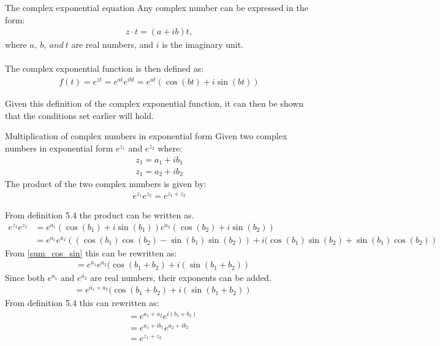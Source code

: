 \begin{definition}{The complex exponential equation}{}
Any complex number can be expressed in the form:
\begin{align*}
	z \cdot t = (a + ib)t,
\end{align*}
where $a,~b,~and~t$ are real numbers, and $i$ is the imaginary unit.
\\
\\
The complex exponential function is then defined as:
\begin{align*}
	f(t)=e^{zt}=e^{at}e^{ibt}=e^{at}\left(\cos(bt)+i\sin(bt)\right)
\end{align*}
\end{definition}
\noindent
Given this definition of the complex exponential function, it can then be shown that the conditions set earlier will hold.
\begin{theorem}{Multiplication of complex numbers in exponential form}{}
Given two complex numbers in exponential form $e^{z_1}$ and $e^{z_2}$ where:
\begin{align*}
z_1=a_1+ib_1
\\
z_1=a_2+ib_2
\end{align*}
The product of the two complex numbers is given by:
\begin{align*}
e^{z_1}e^{z_2}=e^{z_1+z_2}
\end{align*}
\end{theorem}
\begin{prof}{}{}
From definition 5.4 %
the product can be written as.
\begin{align*}
e^{z_1}e^{z_2}&=e^{a_1}(\cos(b_1)+i\sin(b_1))e^{a_2}(\cos(b_2)+i\sin(b_2))
\\
&=e^{a_1}e^{a_2}\left( (\cos(b_1)\cos(b_2)-\sin(b_1) \sin(b_2))+i(\cos(b_1)\sin(b_2)+\sin(b_1)\cos(b_2)\right)
\end{align*}
From \eqref{sum_cos_sin} this can be rewritten as:
\begin{align*}
&=e^{a_1}e^{a_2}(\cos(b_1+b_2)+i(\sin(b_1+b_2))
\end{align*}
Since both $e^{a_1}$ and $e^{a_2}$ are real numbers, their exponents can be added.
\begin{align*}
&=e^{a_1+a_2}(\cos(b_1+b_2)+i(\sin(b_1+b_2))
\end{align*}
From definition 5.4 %
this can rewritten as:
\begin{align*}
&=e^{a_1+a_2}e^{i(b_1+b_2)}
\\
&=e^{a_1+ib_1}e^{a_2+ib_2}
\\
&=e^{z_1+z_2}
\end{align*} 
\end{prof}
